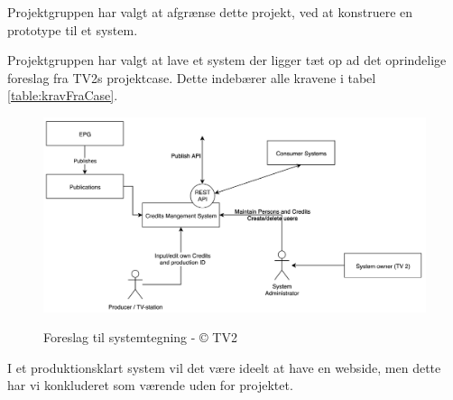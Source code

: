 \noindent %
Projektgruppen har valgt at afgrænse dette projekt, ved at konstruere en prototype til et system.

\noindent %
Projektgruppen har valgt at lave et system der ligger tæt op ad det oprindelige foreslag fra TV2s projektcase. Dette indebærer alle kravene i tabel \ref{table:kravFraCase}.
\begin{figure}[H]
\centering
\includegraphics[scale=0.3]{figures/tv2_system.png}
\label{fig:tv2_system}
\caption{Foreslag til systemtegning - © TV2}
\end{figure}

\noindent %
I et produktionsklart system vil det være ideelt at have en webside, men dette har vi konkluderet som værende uden for projektet.